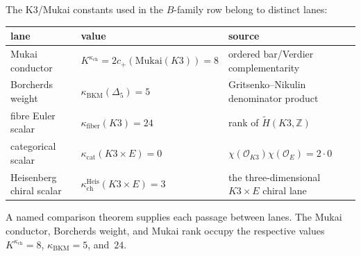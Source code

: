 \begin{proposition}
\label{prop:lattice-k3-mukai-lane-separation}
The K3/Mukai constants used in the $B$-family row belong to distinct
lanes:
\begin{center}
\renewcommand{\arraystretch}{1.2}
\begin{tabular}{l|l|l}
\textbf{lane} & \textbf{value} & \textbf{source}\\ \hline
Mukai conductor &
$K^{\kappa_{\mathrm{ch}}}=2c_+(\mathrm{Mukai}(K3))=8$ &
ordered bar/Verdier complementarity\\
Borcherds weight &
$\kappa_{\mathrm{BKM}}(\Delta_5)=5$ &
Gritsenko--Nikulin denominator product\\
fibre Euler scalar &
$\kappa_{\mathrm{fiber}}(K3)=24$ &
rank of $\widetilde H(K3,\mathbb Z)$\\
categorical scalar &
$\kappa_{\mathrm{cat}}(K3\times E)=0$ &
$\chi(\mathcal O_{K3})\chi(\mathcal O_E)=2\cdot0$\\
Heisenberg chiral scalar &
$\kappa^{\mathrm{Heis}}_{\mathrm{ch}}(K3\times E)=3$ &
the three-dimensional $K3\times E$ chiral lane
\end{tabular}
\end{center}
A named comparison theorem supplies each passage between lanes.  The
Mukai conductor, Borcherds weight, and Mukai rank occupy the respective
values
$K^{\kappa_{\mathrm{ch}}}=8$, $\kappa_{\mathrm{BKM}}=5$, and~$24$.
\end{proposition}

